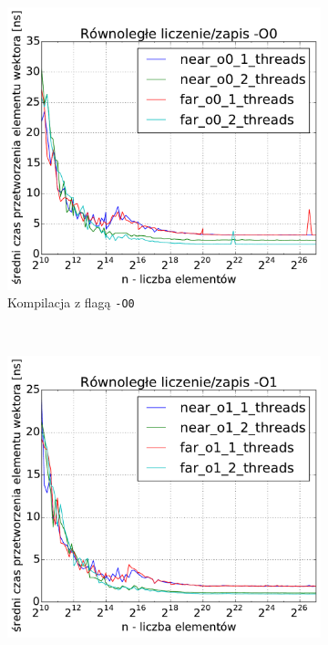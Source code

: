 \clearpage



\begin{figure}
    \centering
    \begin{subfigure}[c]{0.45\textwidth}
        \centering
        \includegraphics[width=\textwidth]{images/benchs_xeon/parallel_count_1_2_O0}
        \caption{Kompilacja z flagą \texttt{-O0}}
    \end{subfigure}
    ~
    \begin{subfigure}[c]{0.45\textwidth}
        \centering
        \includegraphics[width=\textwidth]{images/benchs_xeon/parallel_count_1_2_O1}

\end{subfigure}
\end{figure}
